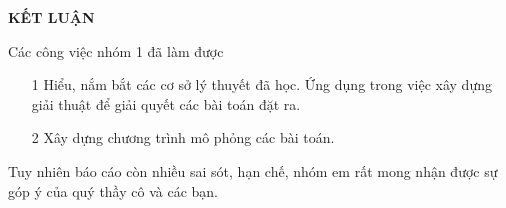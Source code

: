 \centerline{\bf \large\MakeUppercase{Kết luận}}
\vspace{20pt}
\normalsize{
Các công việc nhóm 1 đã làm được
\begin{itemize}
\item[1] Hiểu, nắm bắt các cơ sở lý thuyết đã học. Ứng dụng trong việc xây dựng giải thuật để giải quyết các bài toán đặt ra.
\item[2] Xây dựng chương trình mô phỏng các bài toán. 
\end{itemize}
Tuy nhiên báo cáo còn nhiều sai sót, hạn chế, nhóm em rất mong nhận được sự góp ý của quý thầy cô và các bạn.
}


